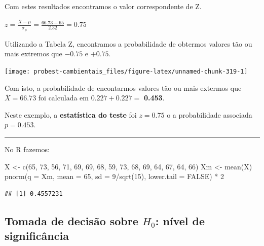 \documentclass[
]{book}
\newenvironment{Shaded}{\begin{snugshade}}{\end{snugshade}}
\newcommand{\AttributeTok}[1]{\textcolor[rgb]{0.77,0.63,0.00}{#1}}
\newcommand{\ConstantTok}[1]{\textcolor[rgb]{0.00,0.00,0.00}{#1}}
\newcommand{\DecValTok}[1]{\textcolor[rgb]{0.00,0.00,0.81}{#1}}
\newcommand{\FunctionTok}[1]{\textcolor[rgb]{0.00,0.00,0.00}{#1}}
\newcommand{\NormalTok}[1]{#1}
\newcommand{\OtherTok}[1]{\textcolor[rgb]{0.56,0.35,0.01}{#1}}
\newcommand{\SpecialCharTok}[1]{\textcolor[rgb]{0.00,0.00,0.00}{#1}}
\begin{document}
Com estes resultados encontramos o valor correspondente de Z.

\(z = \frac{\overline{X} - \mu}{\sigma_{\mu}} = \frac{66.73 - 65}{2.32} = 0.75\)

Utilizando a Tabela Z, encontramos a probabilidade de obtermos valores tão ou mais extremos que \(-0.75\) e \(+0.75\).

\begin{center}\texttt{[image: probest-cambientais\_files/figure-latex/unnamed-chunk-319-1]} \end{center}

Com isto, a probabilidade de encontarmos valores tão ou mais extermos que \(\overline{X} = 66.73\) foi calculada em \(0.227 + 0.227 =\) \textbf{0.453}.

Neste exemplo, a \textbf{estatística do teste} foi \(z = 0.75\) o a probabilidade associada \(p = 0.453\).

\begin{center}\rule{0.5\linewidth}{0.5pt}\end{center}

No R fazemos:

\begin{Shaded}
\begin{Highlighting}[]
\NormalTok{X }\OtherTok{\textless{}{-}} \FunctionTok{c}\NormalTok{(}\DecValTok{65}\NormalTok{, }\DecValTok{73}\NormalTok{, }\DecValTok{56}\NormalTok{, }\DecValTok{71}\NormalTok{, }\DecValTok{69}\NormalTok{, }\DecValTok{69}\NormalTok{, }\DecValTok{68}\NormalTok{, }\DecValTok{59}\NormalTok{, }\DecValTok{73}\NormalTok{, }\DecValTok{68}\NormalTok{, }\DecValTok{69}\NormalTok{, }\DecValTok{64}\NormalTok{, }\DecValTok{67}\NormalTok{, }\DecValTok{64}\NormalTok{, }\DecValTok{66}\NormalTok{)}
\NormalTok{Xm }\OtherTok{\textless{}{-}} \FunctionTok{mean}\NormalTok{(X)}
\FunctionTok{pnorm}\NormalTok{(}\AttributeTok{q =}\NormalTok{ Xm, }\AttributeTok{mean =} \DecValTok{65}\NormalTok{, }\AttributeTok{sd =} \DecValTok{9}\SpecialCharTok{/}\FunctionTok{sqrt}\NormalTok{(}\DecValTok{15}\NormalTok{), }\AttributeTok{lower.tail =} \ConstantTok{FALSE}\NormalTok{) }\SpecialCharTok{*} \DecValTok{2}
\end{Highlighting}
\end{Shaded}

\begin{verbatim}
## [1] 0.4557231
\end{verbatim}

\hypertarget{tomada-de-decisuxe3o-sobre-h_0-nuxedvel-de-significuxe2ncia}{%
\subsection{\texorpdfstring{Tomada de decisão sobre \(H_0\): nível de significância}{Tomada de decisão sobre H\_0: nível de significância}}\label{tomada-de-decisuxe3o-sobre-h_0-nuxedvel-de-significuxe2ncia}}
\end{document}
